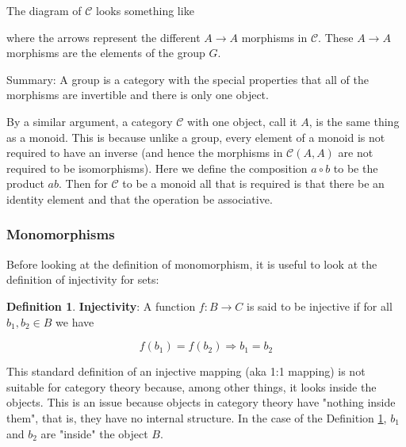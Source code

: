 \documentclass{article}
\theoremstyle{definition}
\newtheorem{definition}{Definition}[section]
\begin{document}
\noindent
The diagram of $\mathcal{C}$ looks something like

\medskip
{}

\medskip
\noindent
where the arrows represent the different $A \to A$ morphisms in
$\mathcal{C}$. These $A \to A$ morphisms are the elements of the
group $G$.

\bigskip
\noindent
Summary: A group is a category with the special properties that 
all of the morphisms are invertible and there is only one object.

\bigskip
\noindent
By a similar argument, a category $\mathcal{C}$ with one object,
call it $A$, is the same thing as a monoid. This is because
unlike a group, every element of a monoid is not required to have
an inverse (and hence the morphisms in $\mathcal{C}(A,A)$ are not
required to be isomorphisms). Here we define the composition 
$a \circ b$ to be the product $ab$. Then for $\mathcal{C}$ to be 
a monoid all that is required is that there be an identity element 
and that the operation be associative. 

\subsubsection{Monomorphisms}
\label{subsubsection:monomorphisms}
Before looking at the definition of monomorphism, it is useful to
look at the definition of injectivity for sets:

\medskip
\begin{definition} {\bf Injectivity}: A function $f:B \to C$ is 
said to be injective if for all $b_{1}, b_{2} \in B$ we 
have 

\begin{equation*}
f(b_{1}) = f(b_{2}) \Rightarrow b_{1} = b_{2}
\end{equation*}

\label{definition:injectivity}
\end{definition}

\noindent
This standard definition of an injective mapping (aka 1:1
mapping) is not suitable for category theory because, among other
things, it looks inside the objects. This is an issue because
objects in category theory have "nothing inside them", that is,
they have no internal structure. In the case of the Definition
\ref{definition:injectivity}, $b_{1}$ and $b_{2}$ are "inside"
the object $B$.
\end{document}
